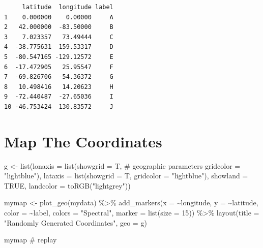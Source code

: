 \documentclass[
  letterpaper,
  DIV=11,
  numbers=noendperiod,
  oneside]{scrreprt}
\newenvironment{Shaded}{\begin{snugshade}}{\end{snugshade}}
\newcommand{\AttributeTok}[1]{\textcolor[rgb]{0.40,0.45,0.13}{#1}}
\newcommand{\CommentTok}[1]{\textcolor[rgb]{0.37,0.37,0.37}{#1}}
\newcommand{\ConstantTok}[1]{\textcolor[rgb]{0.56,0.35,0.01}{#1}}
\newcommand{\DecValTok}[1]{\textcolor[rgb]{0.68,0.00,0.00}{#1}}
\newcommand{\FunctionTok}[1]{\textcolor[rgb]{0.28,0.35,0.67}{#1}}
\newcommand{\NormalTok}[1]{\textcolor[rgb]{0.00,0.23,0.31}{#1}}
\newcommand{\OtherTok}[1]{\textcolor[rgb]{0.00,0.23,0.31}{#1}}
\newcommand{\SpecialCharTok}[1]{\textcolor[rgb]{0.37,0.37,0.37}{#1}}
\newcommand{\StringTok}[1]{\textcolor[rgb]{0.13,0.47,0.30}{#1}}
\begin{document}
\begin{verbatim}
     latitude  longitude label
1    0.000000    0.00000     A
2   42.000000  -83.50000     B
3    7.023357   73.49444     C
4  -38.775631  159.53317     D
5  -80.547165 -129.12572     E
6  -17.472905   25.95547     F
7  -69.826706  -54.36372     G
8   10.498416   14.20623     H
9  -72.440487  -27.65036     I
10 -46.753424  130.83572     J
\end{verbatim}

\section{Map The Coordinates}\label{map-the-coordinates}

\begin{Shaded}
\begin{Highlighting}[]
\NormalTok{g }\OtherTok{\textless{}{-}} \FunctionTok{list}\NormalTok{(}\AttributeTok{lonaxis =} \FunctionTok{list}\NormalTok{(}\AttributeTok{showgrid =}\NormalTok{ T, }\CommentTok{\# geographic parameters}
                         \AttributeTok{gridcolor =} \StringTok{"lightblue"}\NormalTok{), }
          \AttributeTok{lataxis =} \FunctionTok{list}\NormalTok{(}\AttributeTok{showgrid =}\NormalTok{ T, }
                         \AttributeTok{gridcolor =} \StringTok{"lightblue"}\NormalTok{),}
          \AttributeTok{showland =} \ConstantTok{TRUE}\NormalTok{,}
          \AttributeTok{landcolor =} \FunctionTok{toRGB}\NormalTok{(}\StringTok{"lightgrey"}\NormalTok{))}

\NormalTok{mymap }\OtherTok{\textless{}{-}} \FunctionTok{plot\_geo}\NormalTok{(mydata) }\SpecialCharTok{\%\textgreater{}\%}
  \FunctionTok{add\_markers}\NormalTok{(}\AttributeTok{x =} \SpecialCharTok{\textasciitilde{}}\NormalTok{longitude,}
              \AttributeTok{y =} \SpecialCharTok{\textasciitilde{}}\NormalTok{latitude,}
              \AttributeTok{color =} \SpecialCharTok{\textasciitilde{}}\NormalTok{label,}
              \AttributeTok{colors =} \StringTok{"Spectral"}\NormalTok{,}
              \AttributeTok{marker =} \FunctionTok{list}\NormalTok{(}\AttributeTok{size =} \DecValTok{15}\NormalTok{)) }\SpecialCharTok{\%\textgreater{}\%}
  \FunctionTok{layout}\NormalTok{(}\AttributeTok{title =} \StringTok{"Randomly Generated Coordinates"}\NormalTok{,}
         \AttributeTok{geo =}\NormalTok{ g)}

\NormalTok{mymap }\CommentTok{\# replay}
\end{Highlighting}
\end{Shaded}
\end{document}
